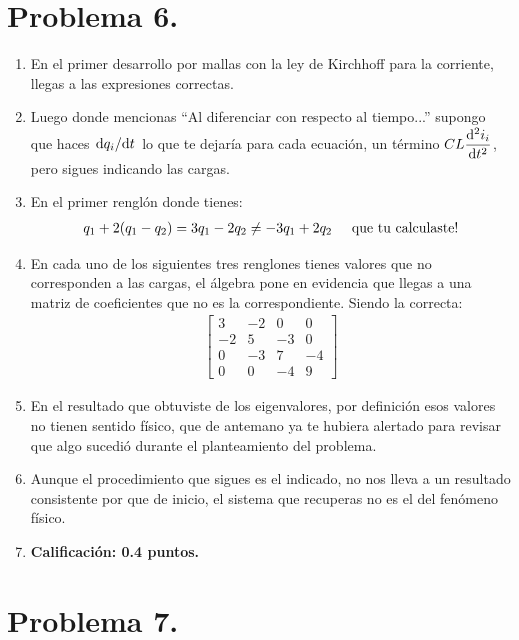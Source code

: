 \section{Problema 6.}

\begin{enumerate}
\item En el primer desarrollo por mallas con la ley de Kirchhoff para la corriente, llegas a las expresiones correctas.
\item Luego donde mencionas \enquote{Al diferenciar con respecto al tiempo...} supongo que haces $\dv*{q_{i}}{t}$ lo que te dejaría para cada ecuación, un término $\displaystyle C L \dv[2]{i_{i}}{t}$, pero sigues indicando las cargas.
\item En el primer renglón donde tienes:
\begin{align*}
q_{1} + 2(q_{1} - q_{2}) = 3 q_{1} - 2 q_{2} \neq - 3 q_{1} + 2 q_{2} \hspace{0.5cm} \text{que tu calculaste!}  
\end{align*}
\item En cada uno de los siguientes tres renglones tienes valores que no corresponden a las cargas, el álgebra pone en evidencia que llegas a una matriz de coeficientes que no es la correspondiente. Siendo la correcta:
\begin{align*}
\begin{bmatrix}
3 & -2 & 0 & 0 \\
-2 & 5 & -3 & 0 \\
0 & -3 & 7 & -4 \\
0 & 0 & -4 & 9
\end{bmatrix}
\end{align*}
\item En el resultado que obtuviste de los eigenvalores, por definición esos valores no tienen sentido físico, que de antemano ya te hubiera alertado para revisar que algo sucedió durante el planteamiento del problema.
\item Aunque el procedimiento que sigues es el indicado, no nos lleva a un resultado consistente por que de inicio, el sistema que recuperas no es el del fenómeno físico.
\item \textbf{Calificación: 0.4 puntos.}
\end{enumerate}

\section{Problema 7.}

